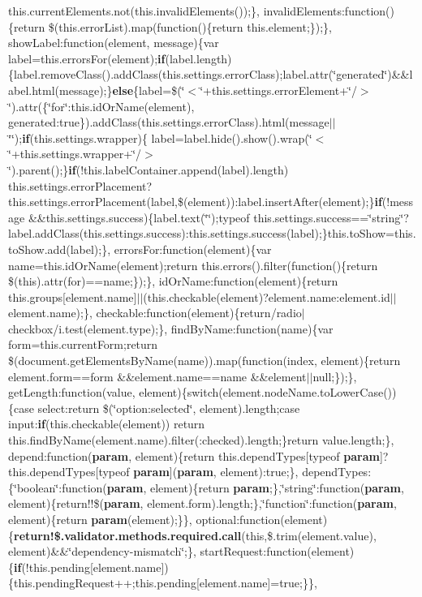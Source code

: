 {\begin{DoxyParamCaption}
this.\+current\+Elements.\+not(this.\+invalid\+Elements());\}, invalid\+Elements\+:function()\{return \$(this.\+error\+List).map(function()\{return this.\+element;\});\}, show\+Label\+:function(element, message)\{var label=this.\+errors\+For(element);{\bf if}(label.\+length)\{label.\+remove\+Class().add\+Class(this.\+settings.\+error\+Class);label.\+attr(\char`\"{}generated\char`\"{})\&\&label.\+html(message);\}{\bf else}\{label=\$(\char`\"{}$<$\char`\"{}+this.\+settings.\+error\+Element+\char`\"{}/$>$\char`\"{}).attr(\{\char`\"{}for\char`\"{}\+:this.\+id\+Or\+Name(element), generated\+:true\}).add\+Class(this.\+settings.\+error\+Class).html(message$\vert$$\vert$\char`\"{}\char`\"{});{\bf if}(this.\+settings.\+wrapper)\{   label=label.\+hide().show().wrap(\char`\"{}$<$\char`\"{}+this.\+settings.\+wrapper+\char`\"{}/$>$\char`\"{}).parent();\}{\bf if}(!this.\+label\+Container.\+append(label).length) this.\+settings.\+error\+Placement?this.\+settings.\+error\+Placement(label,\$(element))\+:label.\+insert\+After(element);\}{\bf if}(!message \&\&this.\+settings.\+success)\{label.\+text(\char`\"{}\char`\"{});typeof this.\+settings.\+success==\char`\"{}string\char`\"{}?label.\+add\+Class(this.\+settings.\+success)\+:this.\+settings.\+success(label);\}this.\+to\+Show=this.\+to\+Show.\+add(label);\}, errors\+For\+:function(element)\{var name=this.\+id\+Or\+Name(element);return this.\+errors().filter(function()\{return \$(this).attr(\textquotesingle{}for\textquotesingle{})==name;\});\}, id\+Or\+Name\+:function(element)\{return this.\+groups\mbox{[}element.\+name\mbox{]}$\vert$$\vert$(this.\+checkable(element)?element.\+name\+:element.\+id$\vert$$\vert$element.\+name);\}, checkable\+:function(element)\{return/radio$\vert$checkbox/i.\+test(element.\+type);\}, find\+By\+Name\+:function(name)\{var form=this.\+current\+Form;return \$(document.\+get\+Elements\+By\+Name(name)).map(function(index, element)\{return element.\+form==form \&\&element.\+name==name \&\&element$\vert$$\vert$null;\});\}, get\+Length\+:function(value, element)\{switch(element.\+node\+Name.\+to\+Lower\+Case())\{case \textquotesingle{}select\textquotesingle{}\+:return \$(\char`\"{}option\+:selected\char`\"{}, element).length;case \textquotesingle{}input\textquotesingle{}\+:{\bf if}(this.\+checkable(element)) return this.\+find\+By\+Name(element.\+name).filter(\textquotesingle{}\+:checked\textquotesingle{}).length;\}return value.\+length;\}, depend\+:function({\bf param}, element)\{return this.\+depend\+Types\mbox{[}typeof {\bf param}\mbox{]}?this.\+depend\+Types\mbox{[}typeof {\bf param}\mbox{]}({\bf param}, element)\+:true;\}, depend\+Types\+:\{\char`\"{}boolean\char`\"{}\+:function({\bf param}, element)\{return {\bf param};\},\char`\"{}string\char`\"{}\+:function({\bf param}, element)\{return!!\$({\bf param}, element.\+form).length;\},\char`\"{}function\char`\"{}\+:function({\bf param}, element)\{return {\bf param}(element);\}\}, optional\+:function(element)\{{\bf return!\$.\+validator.\+methods.\+required.\+call}(this,\$.trim(element.\+value), element)\&\&\char`\"{}dependency-\/mismatch\char`\"{};\}, start\+Request\+:function(element)\{{\bf if}(!this.\+pending\mbox{[}element.\+name\mbox{]})\{this.\+pending\+Request++;this.\+pending\mbox{[}element.\+name\mbox{]}=true;\}\}, 
\end{DoxyParamCaption}}
